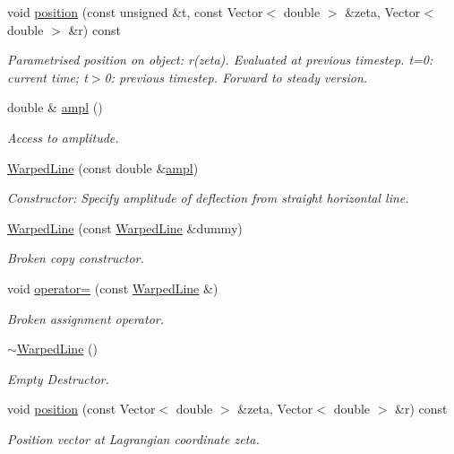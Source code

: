 \begin{DoxyCompactItemize}
void \hyperlink{classWarpedLine_a415d50f6bb49bd903015b51c66e93cd2}{position} (const unsigned \&t, const Vector$<$ double $>$ \&zeta, Vector$<$ double $>$ \&r) const
\begin{DoxyCompactList}\small\item\em Parametrised position on object\+: r(zeta). Evaluated at previous timestep. t=0\+: current time; t$>$0\+: previous timestep. Forward to steady version. \end{DoxyCompactList}\item 
double \& \hyperlink{classWarpedLine_ae43c2f997b9c0de62783375341ac5794}{ampl} ()
\begin{DoxyCompactList}\small\item\em Access to amplitude. \end{DoxyCompactList}\item 
\hyperlink{classWarpedLine_a9d80dca2c907b426f7130579c94f3310}{Warped\+Line} (const double \&\hyperlink{classWarpedLine_ae43c2f997b9c0de62783375341ac5794}{ampl})
\begin{DoxyCompactList}\small\item\em Constructor\+: Specify amplitude of deflection from straight horizontal line. \end{DoxyCompactList}\item 
\hyperlink{classWarpedLine_a53a7426303864ea2d34aeba0a3f6324f}{Warped\+Line} (const \hyperlink{classWarpedLine}{Warped\+Line} \&dummy)
\begin{DoxyCompactList}\small\item\em Broken copy constructor. \end{DoxyCompactList}\item 
void \hyperlink{classWarpedLine_ae2ee796906c0caa7e94f277f6fc499e1}{operator=} (const \hyperlink{classWarpedLine}{Warped\+Line} \&)
\begin{DoxyCompactList}\small\item\em Broken assignment operator. \end{DoxyCompactList}\item 
\hyperlink{classWarpedLine_a4cb07fb7f06d42e2008afe65d8750cad}{$\sim$\+Warped\+Line} ()
\begin{DoxyCompactList}\small\item\em Empty Destructor. \end{DoxyCompactList}\item 
void \hyperlink{classWarpedLine_aaeef89818148ee3a305c561e91c8851d}{position} (const Vector$<$ double $>$ \&zeta, Vector$<$ double $>$ \&r) const
\begin{DoxyCompactList}\small\item\em Position vector at Lagrangian coordinate zeta. \end{DoxyCompactList}\item 

\end{DoxyCompactItemize}
